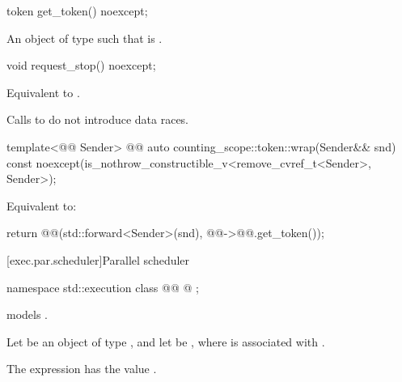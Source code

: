 %
\begin{itemdecl}
token get_token() noexcept;
\end{itemdecl}

\begin{itemdescr}
\pnum
\returns
An object  of type  such that
 is .
\end{itemdescr}

%
\begin{itemdecl}
void request_stop() noexcept;
\end{itemdecl}

\begin{itemdescr}
\pnum
\effects
Equivalent to .

\pnum
\remarks
Calls to  do not introduce data races.
\end{itemdescr}

%
\begin{itemdecl}
template<@@ Sender>
  @@ auto counting_scope::token::wrap(Sender&& snd) const
    noexcept(is_nothrow_constructible_v<remove_cvref_t<Sender>, Sender>);
\end{itemdecl}

\begin{itemdescr}
\pnum
\effects
Equivalent to:
\begin{codeblock}
return @@(std::forward<Sender>(snd), @@->@@.get_token());
\end{codeblock}
\end{itemdescr}

[exec.par.scheduler]{Parallel scheduler}

\begin{codeblock}
namespace std::execution {
  class @@ {
    @\unspec@
  };
}
\end{codeblock}

\pnum
{} models .

\pnum
Let  be an object of type , and
let  be ,
where  is associated with .

\pnum
The expression  has the value
.

